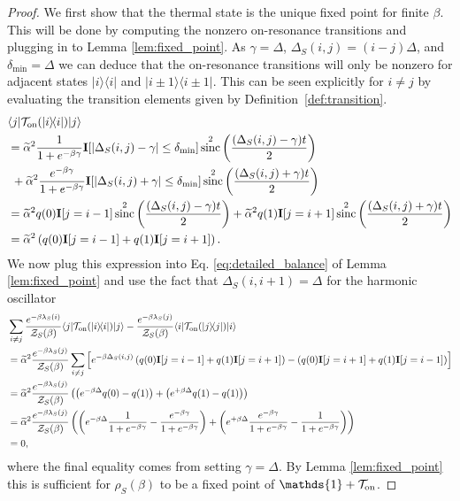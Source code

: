 \documentclass[
 amsmath,amssymb,
 aps,
onecolumn, 
nofootinbib]{revtex4-2}
\newcommand{\on}{\rm on}
\newcommand{\ket}[1]{|#1\rangle}
\newcommand{\bra}[1]{\langle #1|}
\newcommand{\ketbra}[2]{| #1\rangle\! \langle #2|}
\newcommand{\TT}{\mathcal{T}}
\newcommand{\partfun}{\mathcal{Z}}
\newcommand{\identity}{\mathds{1}}
\DeclareMathOperator{\sinc}{sinc}
\begin{document}
\begin{proof}
    We first show that the thermal state is the unique fixed point for finite $\beta$. This will be done by computing the nonzero on-resonance transitions and plugging in to Lemma \ref{lem:fixed_point}. As $\gamma = \Delta$, $\Delta_S(i,j) = (i - j) \Delta$, and $\delta_{\min} = \Delta$ we can deduce that the on-resonance transitions will only be nonzero for adjacent states $\ketbra{i}{i}$ and $\ketbra{i \pm 1}{i \pm 1}$. This can be seen explicitly for $i \neq j$ by evaluating the transition elements given by Definition~\ref{def:transition}.
    \begin{align}
        &\bra{j} \TT_{\on}(\ketbra{i}{i}) \ket{j} \\
        &= \widetilde{\alpha}^2 \frac{1}{1 + e^{-\beta \gamma}} \mathbf{I}[|\Delta_S(i,j) - \gamma| \le \delta_{\min}]  \sinc^2\left(\frac{(\Delta_S(i,j) - \gamma)t}{2}\right) \nonumber \\
    &~+ \widetilde{\alpha}^2 \frac{e^{-\beta \gamma}}{1 + e^{-\beta \gamma}} \mathbf{I}[|\Delta_S(i,j) + \gamma| \le \delta_{\min}]  \sinc^2\left(\frac{(\Delta_S(i,j) + \gamma)t}{2}\right) \\
    &= \widetilde{\alpha}^2 q(0) \mathbf{I}[j = i - 1]  \sinc^2\left(\frac{(\Delta_S(i,j) - \gamma)t}{2}\right) + \widetilde{\alpha}^2 q(1) \mathbf{I}[j = i + 1]  \sinc^2\left(\frac{(\Delta_S(i,j) + \gamma)t}{2}\right) \\
    &= \widetilde{\alpha}^2 \left(q(0) \mathbf{I}[j = i - 1] +  q(1) \mathbf{I}[j = i + 1] \right). \label{eq:harmonic_oscillator_t_matrix}
    \end{align}
    We now plug this expression into Eq. \eqref{eq:detailed_balance} of Lemma \ref{lem:fixed_point} and use the fact that $\Delta_S(i,i+1)=\Delta$ for the harmonic oscillator
    \begin{align}
        &\sum_{i \neq j} \frac{e^{-\beta \lambda_S(i)}}{\partfun_S(\beta)} \bra{j} \TT_{\on}(\ketbra{i}{i}) \ket{j} - \frac{e^{-\beta \lambda_S(j)}}{\partfun_S(\beta)} \bra{i} \TT_{\on}(\ketbra{j}{j}) \ket{i} \\
        &= \widetilde{\alpha}^2 \frac{e^{-\beta \lambda_S(j)}}{\partfun_S(\beta)} \sum_{i \neq j} \left[ e^{-\beta \Delta_S(i,j)} \left(q(0) \mathbf{I}[j = i - 1] +  q(1) \mathbf{I}[j = i + 1] \right) - \left(q(0) \mathbf{I}[j = i + 1] +  q(1) \mathbf{I}[j = i - 1] \right) \right] \\
        &= \widetilde{\alpha}^2 \frac{e^{-\beta \lambda_S(j)}}{\partfun_S(\beta)} \left( \left(e^{-\beta \Delta} q(0) - q(1) \right) + \left(e^{+\beta \Delta} q(1) - q(1) \right)\right) \\
        &= \widetilde{\alpha}^2 \frac{e^{-\beta \lambda_S(j)}}{\partfun_S(\beta)} \left( \left(e^{-\beta \Delta} \frac{1}{1 + e^{-\beta \gamma}} - \frac{e^{-\beta \gamma}}{1 + e^{-\beta \gamma}} \right) + \left(e^{+\beta \Delta} \frac{e^{-\beta \gamma}}{1 + e^{-\beta \gamma}} - \frac{1}{1 + e^{-\beta \gamma}} \right)\right) \\
        &= 0,
    \end{align}
    where the final equality comes from setting $\gamma = \Delta$. By Lemma \ref{lem:fixed_point} this is sufficient for $\rho_S(\beta)$ to be a fixed point of $\identity + \TT_{\on}$. 
    

\end{proof}
\end{document}
